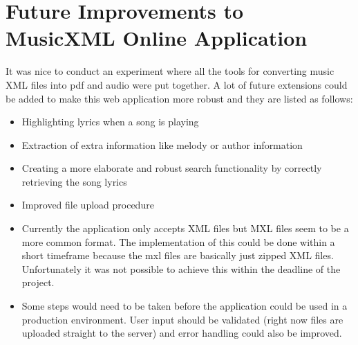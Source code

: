\documentclass[Future.tex]{subfiles}
\begin{document}
\section{Future Improvements to MusicXML Online Application}

It was nice to conduct an experiment where all the tools for converting music XML files into pdf and audio were put together. A lot of future extensions could be added to make this web application more robust and they are listed as follows:

\begin{itemize}
\item Highlighting lyrics when a song is playing
\item Extraction of extra information like melody or author information
\item Creating a more elaborate and robust search functionality by correctly retrieving the song lyrics
\item Improved file upload procedure
\item Currently the application only accepts XML files but MXL files seem to be a more common format. The implementation of this could be done within a short timeframe because the mxl files are basically just zipped XML files. Unfortunately it was not possible to achieve this within the deadline of the project.
\item Some steps would need to be taken before the application could be used in a production environment. User input should be validated (right now files are uploaded straight to the server) and error handling could also be improved.
\end{itemize}
\end{document}
